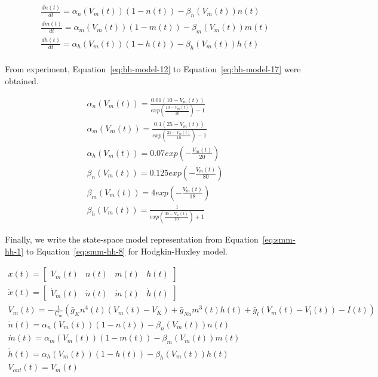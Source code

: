 \begin{align}
    \frac{dn(t)}{dt}= \alpha_n(V_m(t))(1-n(t))-\beta_n(V_m(t))n(t) \label{eq:hh-model-9}  \\
    \frac{dm(t)}{dt}= \alpha_m(V_m(t))(1-m(t))-\beta_m(V_m(t))m(t) \label{eq:hh-model-10} \\
    \frac{dh(t)}{dt}= \alpha_h(V_m(t))(1-h(t))-\beta_h(V_m(t))h(t) \label{eq:hh-model-11} \\
\end{align}

From experiment, Equation~\ref{eq:hh-model-12} to Equation~\ref{eq:hh-model-17} were obtained.

\begin{align}
    \alpha_n(V_m(t)) = \frac{0.01(10 - V_m(t))}{exp(\frac{10-V_m(t)}{10}) - 1} \label{eq:hh-model-12}\\
    \alpha_m(V_m(t)) = \frac{0.1(25 - V_m(t))}{exp(\frac{25-V_m(t)}{10}) - 1} \label{eq:hh-model-13}\\
    \alpha_h(V_m(t)) = 0.07exp(-\frac{V_m(t)}{20}) \label{eq:hh-model-14}\\
    \beta_n(V_m(t)) = 0.125exp(-\frac{V_m(t)}{80}) \label{eq:hh-model-15}\\
    \beta_m(V_m(t)) = 4exp(-\frac{V_m(t)}{18}) \label{eq:hh-model-16}\\
    \beta_h(V_m(t)) = \frac{1}{exp(\frac{30-V_m(t)}{10})+1} \label{eq:hh-model-17}
\end{align}

Finally, we write the state-space model representation from Equation~\ref{eq:smm-hh-1} to 
Equation~\ref{eq:smm-hh-8} for Hodgkin-Huxley model.

\begin{align}
    x(t) = \begin{bmatrix}V_m(t) & n(t) & m(t) & h(t)\end{bmatrix} \label{eq:smm-hh-1}\\
    \dot x(t) = \begin{bmatrix}\dot V_m(t) & \dot n(t) & \dot m(t) & \dot h(t)\end{bmatrix}\label{eq:smm-hh-2} \\
    \dot V_m(t) = -\frac{1}{C_m}(\bar g_Kn^4(t)(V_m(t)-V_K)+\bar g_{Na}m^3(t)h(t)+\bar g_l(V_m(t)-V_l(t)) - I(t)) \label{eq:smm-hh-4}\\
    \dot n(t)= \alpha_n(V_m(t))(1-n(t))-\beta_n(V_m(t))n(t) \label{eq:smm-hh-5}\\
    \dot m(t)= \alpha_m(V_m(t))(1-m(t))-\beta_m(V_m(t))m(t) \label{eq:smm-hh-6}\\
    \dot h(t)= \alpha_h(V_m(t))(1-h(t))-\beta_h(V_m(t))h(t) \label{eq:smm-hh-7}\\
    V_{out}(t) = V_m(t) \label{eq:smm-hh-8}
\end{align}


